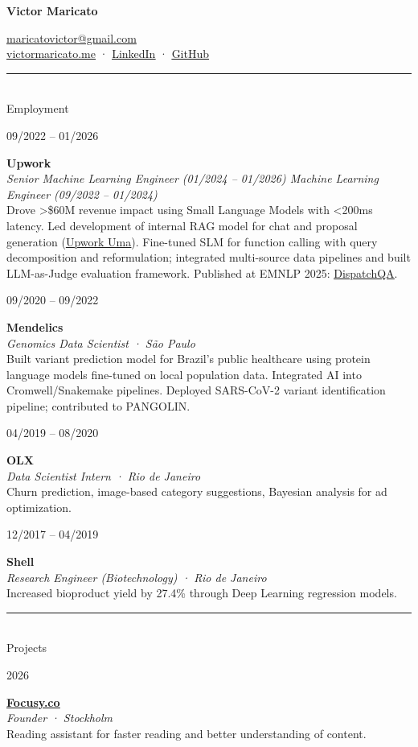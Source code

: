 \documentclass[11pt,a4paper]{article}
\newcommand{\cvsection}[1]{%
    \vspace{0.5em}
    \noindent
    \begin{minipage}[t]{2.5cm}
        \rule{2cm}{0.4pt}\\[0.1em]
        {\large #1}
    \end{minipage}%
    \hfill
    \begin{minipage}[t]{14cm}
        \vspace{1.1em}
    \end{minipage}
    \vspace{0em}
}
\newcommand{\cventry}[4]{%
    \noindent
    \begin{minipage}[t]{2.5cm}
        \raggedleft
        \small #1
    \end{minipage}%
    \hfill
    \begin{minipage}[t]{14cm}
        \textbf{#2}\\
        \textit{#3}\\[0.1em]
        #4
    \end{minipage}
    \vspace{0.3em}
}
\begin{document}
\noindent
\begin{minipage}[t]{0.55\textwidth}
    {\fontsize{34}{40}\selectfont\textbf{Victor Maricato}}
\end{minipage}%
\hfill
\begin{minipage}[t]{0.42\textwidth}
    \raggedleft
    \small
    \href{mailto:maricatovictor@gmail.com}{maricatovictor@gmail.com}\\
    \href{https://victormaricato.me}{\underline{victormaricato.me}} · \href{https://linkedin.com/in/victormaricato}{\underline{LinkedIn}} · \href{https://github.com/victormaricato}{\underline{GitHub}}
\end{minipage}

\cvsection{Employment}

\cventry{09/2022 -- 01/2026}{Upwork}{
    \newline \textnormal{Senior Machine Learning Engineer (01/2024 -- 01/2026)}
    \newline \textnormal{Machine Learning Engineer (09/2022 -- 01/2024)}}
    {Drove >\$60M revenue impact using Small Language Models with <200ms latency. Led development of internal RAG model for chat and proposal generation (\href{https://www.upwork.com/uma}{\underline{Upwork Uma}}). Fine-tuned SLM for function calling with query decomposition and reformulation; integrated multi-source data pipelines and built LLM-as-Judge evaluation framework. Published at EMNLP 2025: \href{https://aclanthology.org/2025.emnlp-industry.154/}{\underline{DispatchQA}}.}

\cventry{09/2020 -- 09/2022}{Mendelics}{Genomics Data Scientist · São Paulo}{Built variant prediction model for Brazil's public healthcare using protein language models fine-tuned on local population data. Integrated AI into Cromwell/Snakemake pipelines. Deployed SARS-CoV-2 variant identification pipeline; contributed to PANGOLIN.}

\cventry{04/2019 -- 08/2020}{OLX}{Data Scientist Intern · Rio de Janeiro}{Churn prediction, image-based category suggestions, Bayesian analysis for ad optimization.}

\cventry{12/2017 -- 04/2019}{Shell}{Research Engineer (Biotechnology) · Rio de Janeiro}{Increased bioproduct yield by 27.4\% through Deep Learning regression models.}

\cvsection{Projects}

\cventry{2026}{\href{https://focusy.co}{\underline{Focusy.co}}}{Founder · Stockholm}{Reading assistant for faster reading and better understanding of content.}
\end{document}
